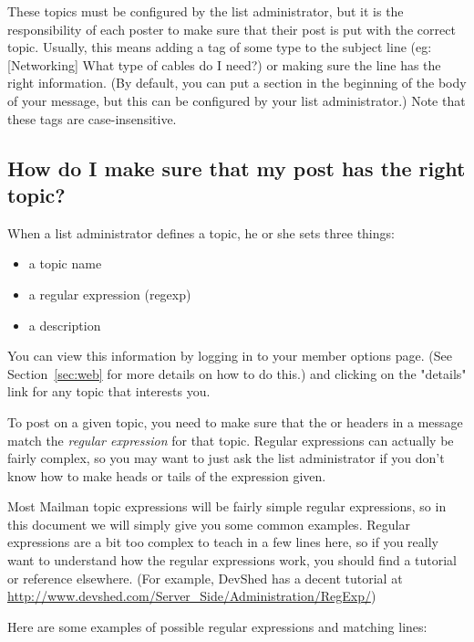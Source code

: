 \documentclass{howto}
\begin{document}
These
topics must be configured by the list administrator, but it is the
responsibility of each poster to make sure that their post is put with 
the correct topic.  Usually, this means adding a tag of some type to the 
subject line (eg: [Networking] What type of cables do I need?) or making
sure the  line has the right information.  (By default, 
you can put a  section in the beginning of the body
of your message, but this can be configured by your list administrator.)
Note that these tags are case-insensitive.

\subsection{How do I make sure that my post has the right 
	topic?\label{sec:posttopic}}

When a list administrator defines a topic, he or she sets three things:
\begin{itemize}
	\item a topic name
	\item a regular expression (regexp)
	\item a description
\end{itemize}

You can view this information by logging in to your member options page. 
 (See Section~\ref{sec:web} for more details on how to do this.) and 
clicking on the "details" link for any topic that interests you.

To post on a given topic, you need to make sure that the 
 or  headers in a message  
match the \emph{regular expression} for that topic.  
Regular expressions can actually be fairly complex, so you may want to 
just ask the list administrator if you don't know how to make
heads or tails of the expression given.  

Most Mailman topic expressions will be fairly simple regular expressions, so 
in this document we will simply give you some common examples.  Regular 
expressions are a bit too complex to teach in a few lines here, so if you
really want to understand how the regular expressions work, you should
find a tutorial or reference elsewhere.  (For example, DevShed has a decent
tutorial at 
\url{http://www.devshed.com/Server_Side/Administration/RegExp/})  

Here are some examples of possible regular expressions and matching lines:
\end{document}
